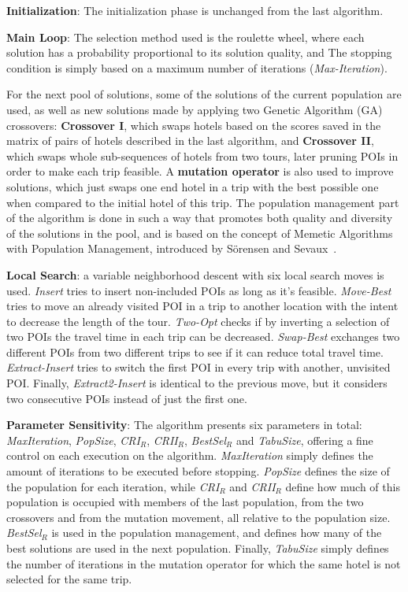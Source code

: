     \textbf{Initialization}: The initialization phase is unchanged from the last algorithm.
    
    \textbf{Main Loop}: The selection method used is the roulette wheel, where each solution has a probability proportional to its solution quality, and The stopping condition is simply based on a maximum number of iterations (\textit{Max-Iteration}).
    
    For the next pool of solutions, some of the solutions of the current population are used, as well as new solutions made by applying two Genetic Algorithm (GA) crossovers: \textbf{Crossover I}, which swaps hotels based on the scores saved in the matrix of pairs of hotels described in the last algorithm, and \textbf{Crossover II}, which swaps whole sub-sequences of hotels from two tours, later pruning POIs in order to make each trip feasible. A \textbf{mutation operator} is also used to improve solutions, which just swaps one end hotel in a trip with the best possible one when compared to the initial hotel of this trip. The population management part of the algorithm is done in such a way that promotes both quality and diversity of the solutions in the pool, and is based on the concept of Memetic Algorithms with Population Management, introduced by S\"orensen and Sevaux~\cite{sorensen2006}.

    \textbf{Local Search}: a variable neighborhood descent with six local search moves is used. \textit{Insert} tries to insert non-included POIs as long as it's feasible. \textit{Move-Best} tries to move an already visited POI in a trip to another location with the intent to decrease the length of the tour. \textit{Two-Opt} checks if by inverting a selection of two POIs the travel time in each trip can be decreased. \textit{Swap-Best} exchanges two different POIs from two different trips to see if it can reduce total travel time. \textit{Extract-Insert} tries to switch the first POI in every trip with another, unvisited POI. Finally, \textit{Extract2-Insert} is identical to the previous move, but it considers two consecutive POIs instead of just the first one.

    \textbf{Parameter Sensitivity}: The algorithm presents six parameters in total: \textit{MaxIteration}, \textit{PopSize}, \textit{CRI$_R$}, \textit{CRII$_R$}, \textit{BestSel$_R$} and \textit{TabuSize}, offering a fine control on each execution on the algorithm. \textit{MaxIteration} simply defines the amount of iterations to be executed before stopping. \textit{PopSize} defines the size of the population for each iteration, while \textit{CRI$_R$} and \textit{CRII$_R$} define how much of this population is occupied with members of the last population, from the two crossovers and from the mutation movement, all relative to the population size. \textit{BestSel$_R$} is used in the population management, and defines how many of the best solutions are used in the next population. Finally, \textit{TabuSize} simply defines the number of iterations in the mutation operator for which the same hotel is not selected for the same trip.
    
